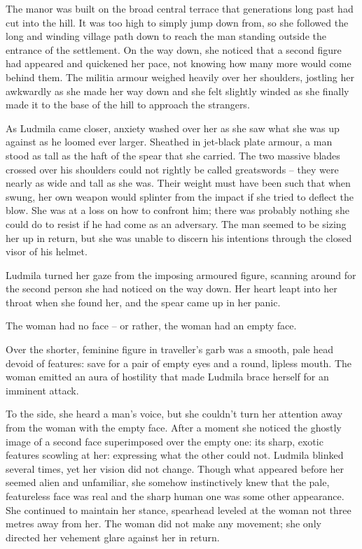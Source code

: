  

The manor was built on the broad central terrace that generations long past had cut into the hill. It was too high to simply jump down from, so she followed the long and winding village path down to reach the man standing outside the entrance of the settlement. On the way down, she noticed that a second figure had appeared and quickened her pace, not knowing how many more would come behind them. The militia armour weighed heavily over her shoulders, jostling her awkwardly as she made her way down and she felt slightly winded as she finally made it to the base of the hill to approach the strangers.

 

As Ludmila came closer, anxiety washed over her as she saw what she was up against as he loomed ever larger. Sheathed in jet-black plate armour, a man stood as tall as the haft of the spear that she carried. The two massive blades crossed over his shoulders could not rightly be called greatswords – they were nearly as wide and tall as she was. Their weight must have been such that when swung, her own weapon would splinter from the impact if she tried to deflect the blow. She was at a loss on how to confront him; there was probably nothing she could do to resist if he had come as an adversary. The man seemed to be sizing her up in return, but she was unable to discern his intentions through the closed visor of his helmet.

 

Ludmila turned her gaze from the imposing armoured figure, scanning around for the second person she had noticed on the way down. Her heart leapt into her throat when she found her, and the spear came up in her panic.

 

The woman had no face – or rather, the woman had an empty face.

 

Over the shorter, feminine figure in traveller’s garb was a smooth, pale head devoid of features: save for a pair of empty eyes and a round, lipless mouth. The woman emitted an aura of hostility that made Ludmila brace herself for an imminent attack.

 

To the side, she heard a man’s voice, but she couldn’t turn her attention away from the woman with the empty face. After a moment she noticed the ghostly image of a second face superimposed over the empty one: its sharp, exotic features scowling at her: expressing what the other could not. Ludmila blinked several times, yet her vision did not change. Though what appeared before her seemed alien and unfamiliar, she somehow instinctively knew that the pale, featureless face was real and the sharp human one was some other appearance. She continued to maintain her stance, spearhead leveled at the woman not three metres away from her. The woman did not make any movement; she only directed her vehement glare against her in return.

